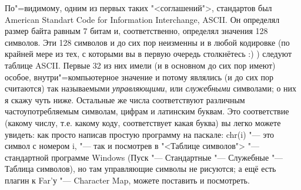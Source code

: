 По"=видимому, одним из первых таких "<соглашений">, стандартов был American Standart 
Code for Information Interchange, ASCII. Он определял размер байта равным 7 битам и, соответственно, определял значения 128 символов. Эти 128 символов и 
до сих пор неизменны и в любой кодировке (по крайней мере из тех, с которыми вы 
в первую очередь столкнётесь :) ) следуют таблице ASCII. Первые 32 из них
имели (и в основном до сих пор имеют) особое, внутри"=компьютерное значение и 
потому являлись (и до сих пор считаются) так называемыми \textit{управляющими}, 
или \textit{служебными} символами; о них я скажу чуть ниже.  Остальные же 
числа соответствуют различным частоупотребляемым символам, цифрам и латинским 
буквам. Это соответствие (какому числу, т.е. какому коду, соответствует какая 
буква) вы легко можете увидеть: как просто написав простую программу на 
паскале: chr(i) "--- это символ с номером i, "--- так и посмотрев в "<Таблице 
символов"> "--- стандартной программе Windows (Пуск "--- Стандартные "--- 
Служебные "--- Таблица символов), но там управляющие символы не рисуются; а ещё 
есть плагин к Far'у "--- Character Map, можете поставить и посмотреть.
    
